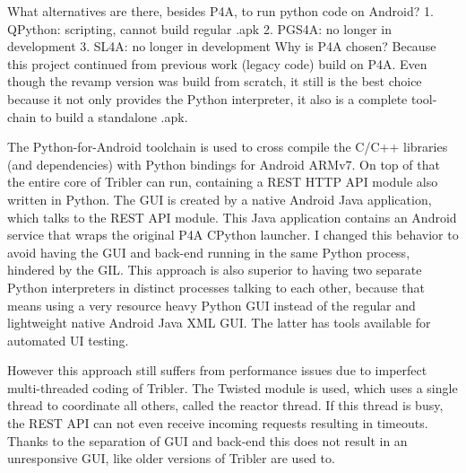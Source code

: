 What alternatives are there, besides P4A, to run python code on Android?
1. QPython: scripting, cannot build regular .apk
2. PGS4A: no longer in development
3. SL4A: no longer in development
Why is P4A chosen?
Because this project continued from previous work (legacy code) build on P4A.
Even though the revamp version was build from scratch, it still is the best choice because it not only provides the Python interpreter, it also is a complete tool-chain to build a standalone .apk.

The Python-for-Android toolchain is used to cross compile the C/C++ libraries (and dependencies) with Python bindings for Android ARMv7.
On top of that the entire core of Tribler can run, containing a REST HTTP API module also written in Python.
The GUI is created by a native Android Java application, which talks to the REST API module.
This Java application contains an Android service that wraps the original P4A CPython launcher.
I changed this behavior to avoid having the GUI and back-end running in the same Python process, hindered by the GIL.
This approach is also superior to having two separate Python interpreters in distinct processes talking to each other, because that means using a very resource heavy Python GUI instead of the regular and lightweight native Android Java XML GUI.
The latter has tools available for automated UI testing.


However this approach still suffers from performance issues due to imperfect multi-threaded coding of Tribler.
The Twisted module is used, which uses a single thread to coordinate all others, called the reactor thread.
If this thread is busy, the REST API can not even receive incoming requests resulting in timeouts.
Thanks to the separation of GUI and back-end this does not result in an unresponsive GUI, like older versions of Tribler are used to.
